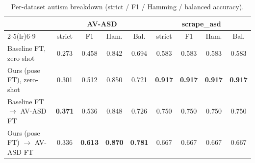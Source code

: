 \begin{table}[tbp]
\centering
\small
\caption{Per-dataset autism breakdown (strict / F1 / Hamming / balanced accuracy).}
\label{tab:autism-per-dataset}
\setlength{\tabcolsep}{4pt}
\begin{tabular}{lcccccccc}
\toprule
                                          & \multicolumn{4}{c}{AV-ASD} & \multicolumn{4}{c}{scrape\_asd} \\
\cmidrule(lr){2-5}\cmidrule(lr){6-9}
                                          & strict & F1 & Ham. & Bal. & strict & F1 & Ham. & Bal. \\
\midrule
Baseline FT, zero-shot                    & 0.273 & 0.458 & 0.842 & 0.694 & 0.583 & 0.583 & 0.583 & 0.583 \\
Ours (pose FT), zero-shot                 & 0.301 & 0.512 & 0.850 & 0.721 & \textbf{0.917} & \textbf{0.917} & \textbf{0.917} & \textbf{0.917} \\
Baseline FT $\to$ AV-ASD FT               & \textbf{0.371} & 0.536 & 0.848 & 0.726 & 0.750 & 0.750 & 0.750 & 0.750 \\
Ours (pose FT) $\to$ AV-ASD FT            & 0.336 & \textbf{0.613} & \textbf{0.870} & \textbf{0.781} & 0.667 & 0.667 & 0.667 & 0.667 \\
\bottomrule
\end{tabular}
\end{table}
